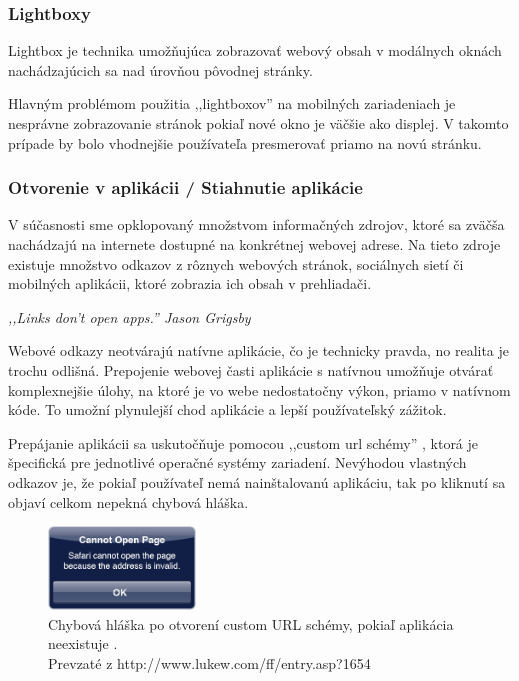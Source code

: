 \subsubsection{Lightboxy} %
\label{subsub:lightboxy}

Lightbox je technika umožňujúca zobrazovať webový obsah v modálnych oknách nachádzajúcich sa nad úrovňou pôvodnej stránky.

Hlavným problémom použitia ,,lightboxov'' na mobilných zariadeniach je nesprávne zobrazovanie stránok pokiaľ nové okno je väčšie ako displej. V takomto prípade by bolo vhodnejšie používateľa presmerovať priamo na novú stránku.


\subsubsection{Otvorenie v aplikácii / Stiahnutie aplikácie} %
\label{ssub:otvorenie_v_aplik_cii}

V súčasnosti sme opklopovaný množstvom informačných zdrojov, ktoré sa zväčša nachádzajú na internete dostupné na konkrétnej webovej adrese. Na tieto zdroje existuje množstvo odkazov z rôznych webových stránok, sociálnych sietí či mobilných aplikácii, ktoré zobrazia ich obsah v prehliadači.

\begin{fancybox}
\textit{,,Links don’t open apps.'' Jason Grigsby} \cite{links}
\end{fancybox}

Webové odkazy neotvárajú natívne aplikácie, čo je technicky pravda, no realita je trochu odlišná. Prepojenie webovej časti aplikácie s natívnou umožňuje otvárať komplexnejšie úlohy, na ktoré je vo webe nedostatočny výkon, priamo v natívnom kóde. To umožní plynulejší chod aplikácie a lepší používateľský zážitok.

Prepájanie aplikácii sa uskutočňuje pomocou ,,custom url schémy'' \cite{urlscheme}, ktorá je špecifická pre jednotlivé operačné systémy zariadení. Nevýhodou vlastných odkazov je, že pokiaľ používateľ nemá nainštalovanú aplikáciu, tak po kliknutí sa objaví celkom nepekná chybová hláška.

\begin{figure}[H]
	\centering
	\includegraphics[width=0.35\textwidth]{img/customerror.png}
	\caption[Chybová hláška po otvorení custom URL schémy, pokiaľ aplikácia neexistuje]{
		Chybová hláška po otvorení custom URL schémy, pokiaľ aplikácia neexistuje \cite{customscheme}.\\
		Prevzaté z http://www.lukew.com/ff/entry.asp?1654}
	\label{fig: customerror}
\end{figure}

